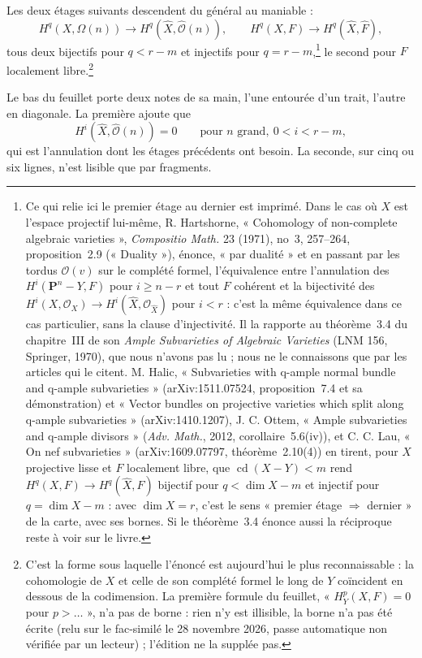 \documentclass[11pt,a4paper]{article}
\begin{document}
Les deux étages suivants descendent du général au maniable :
\[
  H^{q}(X, \Omega(n)) \longrightarrow H^{q}(\widehat{X}, \widehat{\mathcal{O}}(n)),
  \qquad
  H^{q}(X, F) \longrightarrow H^{q}(\widehat{X}, \widehat{F}),
\]
tous deux bijectifs pour $q < r-m$ et injectifs pour $q = r - m$,\footnote{Ce
qui relie ici le premier étage au dernier est imprimé. Dans le cas où $X$ est
l'espace projectif lui-même, R. Hartshorne, « Cohomology of non-complete
algebraic varieties », \emph{Compositio Math.} 23 (1971), no~3, 257--264,
proposition~2.9 (« Duality »), énonce, « par dualité » et en passant par les
tordus $\mathcal{O}(v)$ sur le complété formel, l'équivalence entre
l'annulation des $H^{i}(\mathbf{P}^{n} - Y, F)$ pour $i \geqslant n - r$ et
tout $F$ cohérent et la bijectivité des $H^{i}(X, \mathcal{O}_{X}) \to
H^{i}(\widehat{X}, \mathcal{O}_{\widehat{X}})$ pour $i < r$ : c'est la même
équivalence dans ce cas particulier, sans la clause d'injectivité. Il la
rapporte au théorème~3.4 du chapitre~III de son \emph{Ample Subvarieties of
Algebraic Varieties} (LNM 156, Springer, 1970), que nous n'avons pas lu ; nous
ne le connaissons que par les articles qui le citent. M. Halic, « Subvarieties
with q-ample normal bundle and q-ample subvarieties » (arXiv:1511.07524,
proposition~7.4 et sa démonstration) et « Vector bundles on projective
varieties which split along q-ample subvarieties » (arXiv:1410.1207), J. C.
Ottem, « Ample subvarieties and q-ample divisors » (\emph{Adv. Math.}, 2012,
corollaire~5.6(iv)), et C. C. Lau, « On nef subvarieties » (arXiv:1609.07797,
théorème~2.10(4)) en tirent, pour $X$ projective lisse et $F$ localement
libre, que $\operatorname{cd}(X - Y) < m$ rend $H^{q}(X, F) \to
H^{q}(\widehat{X}, \widehat{F})$ bijectif pour $q < \dim X - m$ et injectif
pour $q = \dim X - m$ : avec $\dim X = r$, c'est le sens « premier étage
$\Rightarrow$ dernier » de la carte, avec ses bornes. Si le théorème~3.4
énonce aussi la réciproque reste à voir sur le livre.} le second
pour $F$ localement libre.\footnote{C'est la forme sous laquelle l'énoncé est
aujourd'hui le plus reconnaissable : la cohomologie de $X$ et celle de son
complété formel le long de $Y$ coïncident en dessous de la codimension. La
première formule du feuillet, « $H^{p}_{Y}(X,F) = 0$ pour $p > \ldots$ », n'a
pas de borne : rien n'y est illisible, la borne n'a pas été écrite (relu sur le
fac-similé le 28 novembre 2026, passe automatique non vérifiée par un
lecteur) ; l'édition ne la supplée pas.}

Le bas du feuillet porte deux notes de sa main, l'une entourée d'un trait,
l'autre en diagonale. La première ajoute que
\[
  H^{i}(\widehat{X}, \widehat{\mathcal{O}}(n)) = 0
  \qquad \text{pour } n \text{ grand}, \ 0 < i < r-m ,
\]
qui est l'annulation dont les étages précédents ont besoin. La seconde, sur
cinq ou six lignes, n'est lisible que par fragments.
\end{document}
